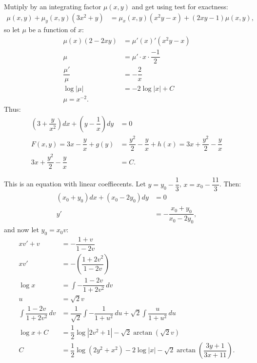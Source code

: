 \documentclass{article}
\begin{document}
    \newpage
    \begin{solution}[Solution 4b]
        Mutiply by an integrating factor $\mu(x,y)$ and get using test for exactness:
        \begin{align}
            \mu(x,y) + \mu_y(x,y)(3x^2+y) &= \mu_x(x,y)(x^2y-x) + (2xy -1) \mu(x,y),
        \end{align}
        so let $\mu$ be a function of $x$:
        \begin{align}
            \mu(x)(2-2xy) &= \mu'(x)'(x^2y-x) \\
            \mu &= \mu' \cdot x \cdot \dfrac{-1}{2} \\ 
            \dfrac{\mu'}{\mu} &= -\dfrac{2}{x} \\ 
            \log |\mu| &= -2\log|x| + C\\ 
            \mu = x^{-2}. 
        \end{align}
        Thus:
        \begin{align}
            \left(3+\dfrac{y}{x^2}\right)dx + \left(y-\dfrac{1}{x}\right)dy &= 0 \\
            F(x,y) = 3x - \dfrac{y}{x} + g(y) &= \dfrac{y^2}{2} - \dfrac{y}{x} + h(x) = 3x + \dfrac{y^2}{2} - \dfrac{y}{x} \\ 
            3x + \dfrac{y^2}{2} - \dfrac{y}{x} &= C. 
        \end{align}
    \end{solution}
    \newpage
    \begin{solution}[Solution 4c]
        This is an equation with linear coeffiecents. Let $y = y_0 - \dfrac{1}{3}$, $x = x_0 - \dfrac{11}{3}$. Then:
        \begin{align}
            (x_0 + y_0)dx + (x_0-2y_0)dy &= 0 \\ 
            y' &= -\dfrac{x_0 + y_0}{x_0 - 2y_0},
        \end{align}
        and now let $y_0 = x_0 v$:
        \begin{align}
            xv' + v &= -\dfrac{1+v}{1-2v} \\ 
            xv' &= - \left(\dfrac{1+2v^2}{1-2v} \right) \\ 
            \log x &= \int - \dfrac{1-2v}{1+2v^2} \, dv \\
            u &= \sqrt{2} v \\ 
            \int \dfrac{1-2v}{1+2v^2} \, dv &= \dfrac{1}{\sqrt{2}}\int- \dfrac{1}{1+u^2}\, du + \sqrt{2} \int \dfrac{u}{1+u^2} \, du \\ 
            \log x + C &= \dfrac{1}{2} \log |2v^2 + 1| - \sqrt{2} \arctan \left(\sqrt{2}v \right) \\ 
            C &= \dfrac{1}{2} \log (2y^2 + x^2) - 2 \log |x| - \sqrt{2}\arctan \left(\dfrac{3y + 1}{3x+11}\right).
        \end{align}
    \end{solution}
\end{document}
